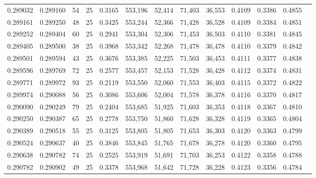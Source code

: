\begin{tabular}{rrrrrrrrrrrrr}
0.289032 & 0.289160 &    54 &  25 &                                     0.3165 & 553,196 &  52,414 &  71,403 &  36,553 & 0.4109 & 0.3386 & 0.4855 \\
0.289161 & 0.289250 &    48 &  25 &                                     0.3425 & 553,244 &  52,366 &  71,428 &  36,528 & 0.4109 & 0.3384 & 0.4851 \\
0.289252 & 0.289404 &    60 &  25 &                                     0.2941 & 553,304 &  52,306 &  71,453 &  36,503 & 0.4110 & 0.3381 & 0.4845 \\
0.289405 & 0.289500 &    38 &  25 &                                     0.3968 & 553,342 &  52,268 &  71,478 &  36,478 & 0.4110 & 0.3379 & 0.4842 \\
0.289501 & 0.289594 &    43 &  25 &                                     0.3676 & 553,385 &  52,225 &  71,503 &  36,453 & 0.4111 & 0.3377 & 0.4838 \\
0.289596 & 0.289769 &    72 &  25 &                                     0.2577 & 553,457 &  52,153 &  71,528 &  36,428 & 0.4112 & 0.3374 & 0.4831 \\
0.289771 & 0.289972 &    93 &  25 &                                     0.2119 & 553,550 &  52,060 &  71,553 &  36,403 & 0.4115 & 0.3372 & 0.4822 \\
0.289974 & 0.290088 &    56 &  25 &                                     0.3086 & 553,606 &  52,004 &  71,578 &  36,378 & 0.4116 & 0.3370 & 0.4817 \\
0.290090 & 0.290249 &    79 &  25 &                                     0.2404 & 553,685 &  51,925 &  71,603 &  36,353 & 0.4118 & 0.3367 & 0.4810 \\
0.290250 & 0.290387 &    65 &  25 &                                     0.2778 & 553,750 &  51,860 &  71,628 &  36,328 & 0.4119 & 0.3365 & 0.4804 \\
0.290389 & 0.290518 &    55 &  25 &                                     0.3125 & 553,805 &  51,805 &  71,653 &  36,303 & 0.4120 & 0.3363 & 0.4799 \\
0.290524 & 0.290637 &    40 &  25 &                                     0.3846 & 553,845 &  51,765 &  71,678 &  36,278 & 0.4120 & 0.3360 & 0.4795 \\
0.290638 & 0.290782 &    74 &  25 &                                     0.2525 & 553,919 &  51,691 &  71,703 &  36,253 & 0.4122 & 0.3358 & 0.4788 \\
0.290782 & 0.290902 &    49 &  25 &                                     0.3378 & 553,968 &  51,642 &  71,728 &  36,228 & 0.4123 & 0.3356 & 0.4784 \\

\end{tabular}
